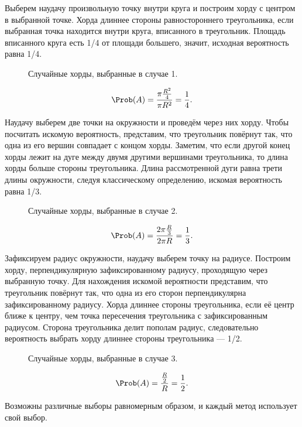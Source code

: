 \begin{description}[leftmargin=0cm]
\item[Метод «случайного центра».]
Выберем наудачу произвольную точку внутри круга и построим хорду с центром в выбранной точке. Хорда длиннее стороны равностороннего треугольника, если выбранная точка находится внутри круга, вписанного в треугольник. Площадь вписанного круга есть 1/4 от площади большего, значит, исходная вероятность равна 1/4.
\begin{figure}[ht]
  \centering
  \def\svgwidth{8em}
  
  \caption{Случайные хорды, выбранные в случае 1.}
\end{figure}
\[
  \Prob(A) = \frac{\pi \frac{R^2}{4}}{\pi R^2} = \frac{1}{4}.
\]
\item[Метод «случайных концов».] Наудачу выберем две точки на окружности и проведём через них хорду. Чтобы посчитать искомую вероятность, представим, что треугольник повёрнут так, что одна из его вершин совпадает с концом хорды. Заметим, что если другой конец хорды лежит на дуге между двумя другими вершинами треугольника, то длина хорды больше стороны треугольника. Длина рассмотренной дуги равна трети длины окружности, следуя классическому определению, искомая вероятность равна 1/3.
\begin{figure}[ht]
  \centering
  \def\svgwidth{8em}
  
  \caption{Случайные хорды, выбранные в случае 2.}
\end{figure}
\[
  \Prob(A) = \frac{2\pi \frac{R}{3}}{2 \pi R} = \frac{1}{3}.
\]
\item[Метод «случайного радиуса».] Зафиксируем радиус окружности, наудачу выберем точку на радиусе. Построим хорду, перпендикулярную зафиксированному радиусу, проходящую через выбранную точку. Для нахождения искомой вероятности представим, что треугольник повёрнут так, что одна из его сторон перпендикулярна зафиксированному радиусу. Хорда длиннее стороны треугольника, если её центр ближе к центру, чем точка пересечения треугольника с зафиксированным радиусом. Сторона треугольника делит пополам радиус, следовательно вероятность выбрать хорду длиннее стороны треугольника --- 1/2.
\begin{figure}[ht]
  \centering
  \def\svgwidth{8em}
  
  \caption{Случайные хорды, выбранные в случае 3.}
\end{figure}
\[ \Prob(A) = \frac{\frac{R}{2}}{R} = \frac{1}{2}. \]
\end{description}
Возможны различные выборы равномерным образом, и каждый метод использует свой выбор.
